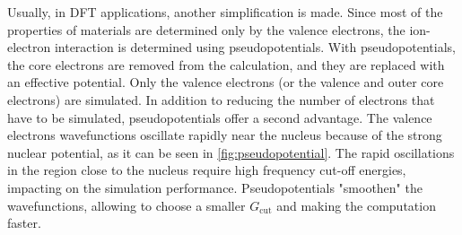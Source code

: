 Usually, in DFT applications, another simplification is made. Since most of the properties of materials are determined only by the valence electrons, the ion-electron interaction is determined using pseudopotentials. With pseudopotentials, the core electrons are removed from the calculation, and they are replaced with an effective potential. Only the valence electrons (or the valence and outer core electrons) are simulated. In addition to reducing the number of electrons that have to be simulated, pseudopotentials offer a second advantage. The valence electrons wavefunctions oscillate rapidly near the nucleus because of the strong nuclear potential, as it can be seen in \cref{fig:pseudopotential}.
The rapid oscillations in the region close to the nucleus require high frequency cut-off energies, impacting on the simulation performance. Pseudopotentials "smoothen" the wavefunctions, allowing to choose a smaller $G_\text{cut}$ and making the computation faster.